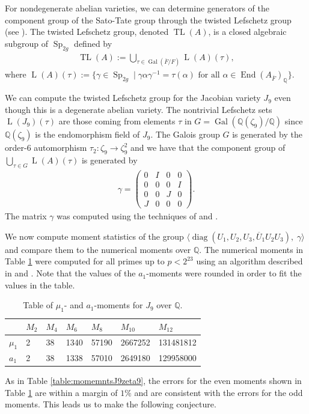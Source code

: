 \documentclass[reqno, oneside, 12pt]{amsart}
\DeclareMathOperator{\Sp}{Sp}
\DeclareMathOperator{\Gal}{Gal}
\DeclareMathOperator{\End}{End}
\DeclareMathOperator{\diag}{diag}
\DeclareMathOperator{\TL}{TL}
\DeclareMathOperator{\LL}{L}
\newcommand{\Q}{\mathbb{Q}}
\theoremstyle{remark}
\numberwithin{equation}{section}
\begin{document}
For nondegenerate abelian varieties, we can determine generators of the component group of the Sato-Tate group through the twisted Lefschetz group (see \cite{Banaszak2015}). The twisted Lefschetz  group, denoted $\TL(A)$, is a closed algebraic subgroup of  $\Sp_{2g}$ defined by
\begin{align*}%
\TL(A):=\bigcup_{\tau \in \Gal(\overline{F}/F)} \LL(A)(\tau),
\end{align*}
where $\LL(A)(\tau):=\{\gamma \in \Sp_{2g}\mid \gamma \alpha \gamma^{-1}=\tau(\alpha) \text{ for all }\alpha \in \End(A_{\overline{F}})_\mathbb{Q}\}$.


We can compute the twisted Lefschetz group for the Jacobian variety $J_9$ even though this is a degenerate abelian variety. The nontrivial Lefschetz sets $\LL(J_9)(\tau)$ are those coming from elements $\tau$ in $G=\Gal(\Q(\zeta_9)/\Q)$ since $\Q(\zeta_9)$ is the endomorphism field of $J_9$. The Galois group $G$ is generated by the order-6 automorphism $\tau_2\colon \zeta_9\to\zeta_9^2$ and we have that the component group of $\bigcup_{\tau \in G}\LL(A)(\tau)$ is generated by 
\begin{align}\label{eqn:J9gamma} \gamma= \begin{pmatrix}0&I&0&0\\0&0&0&I\\0&0&J&0\\J&0&0&0 \end{pmatrix}.
\end{align}
The matrix $\gamma$ was computed using the techniques of \cite{EmoryGoodson2020} and \cite{GoodsonCatalan}.


We now compute moment statistics of the group $\langle\diag(U_1,U_2,U_3,\overline U_1U_2U_3),\; \gamma\rangle$ and compare them to the numerical moments over $\Q$. The numerical moments in Table \ref{table:momemntsJ9Q} were computed for all primes up to $p<2^{23}$ using an algorithm described in \cite{HarveySuth2014} and \cite{HarveySuth2016}. Note that the values of the $a_1$-moments were rounded in order to fit the values in the table.

\begin{table}[h]
\begin{tabular}{|l|l|l|l|l|l|l|}
\hline
&$M_2$ & $M_4$ & $M_6$ & $M_8$& $M_{10}$& $M_{12}$\\ 
\hline
$\mu_1$ & 2& 38&1340 &57190& 2667252& 131481812\\
$a_1$  & 2  &38 &1338 &57010& 2649180& 129958000 \\
\hline
\end{tabular}
\caption{Table of $\mu_1$- and  $a_1$-moments for $J_9$ over $\mathbb Q$.}\label{table:momemntsJ9Q}\vspace{-.2in}
\end{table}
As in Table \ref{table:momemntsJ9zeta9}, the errors for the even moments shown in Table \ref{table:momemntsJ9Q} are within a margin of $1\%$ and are consistent with the errors for the odd moments. This leads us to make the following conjecture.
\end{document}
